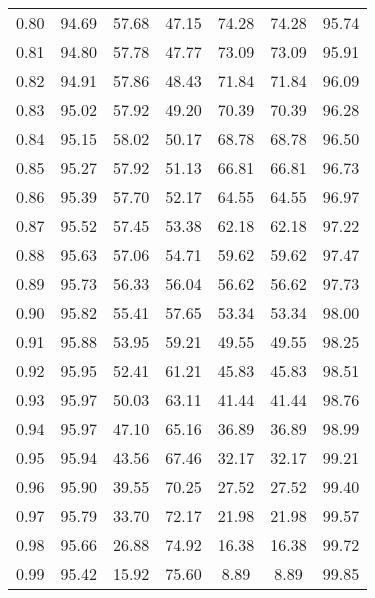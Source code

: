 \begin{tabular}{|c|c|c|c|c|c|c|}
      0.80 &     94.69 &     57.68 &      47.15 &   74.28 &      74.28 &         95.74 \\
      0.81 &     94.80 &     57.78 &      47.77 &   73.09 &      73.09 &         95.91 \\
      0.82 &     94.91 &     57.86 &      48.43 &   71.84 &      71.84 &         96.09 \\
      0.83 &     95.02 &     57.92 &      49.20 &   70.39 &      70.39 &         96.28 \\
      0.84 &     95.15 &     58.02 &      50.17 &   68.78 &      68.78 &         96.50 \\
      0.85 &     95.27 &     57.92 &      51.13 &   66.81 &      66.81 &         96.73 \\
      0.86 &     95.39 &     57.70 &      52.17 &   64.55 &      64.55 &         96.97 \\
      0.87 &     95.52 &     57.45 &      53.38 &   62.18 &      62.18 &         97.22 \\
      0.88 &     95.63 &     57.06 &      54.71 &   59.62 &      59.62 &         97.47 \\
      0.89 &     95.73 &     56.33 &      56.04 &   56.62 &      56.62 &         97.73 \\
      0.90 &     95.82 &     55.41 &      57.65 &   53.34 &      53.34 &         98.00 \\
      0.91 &     95.88 &     53.95 &      59.21 &   49.55 &      49.55 &         98.25 \\
      0.92 &     95.95 &     52.41 &      61.21 &   45.83 &      45.83 &         98.51 \\
      0.93 &     95.97 &     50.03 &      63.11 &   41.44 &      41.44 &         98.76 \\
      0.94 &     95.97 &     47.10 &      65.16 &   36.89 &      36.89 &         98.99 \\
      0.95 &     95.94 &     43.56 &      67.46 &   32.17 &      32.17 &         99.21 \\
      0.96 &     95.90 &     39.55 &      70.25 &   27.52 &      27.52 &         99.40 \\
      0.97 &     95.79 &     33.70 &      72.17 &   21.98 &      21.98 &         99.57 \\
      0.98 &     95.66 &     26.88 &      74.92 &   16.38 &      16.38 &         99.72 \\
      0.99 &     95.42 &     15.92 &      75.60 &    8.89 &       8.89 &         99.85 \\
\bottomrule
\end{tabular}
